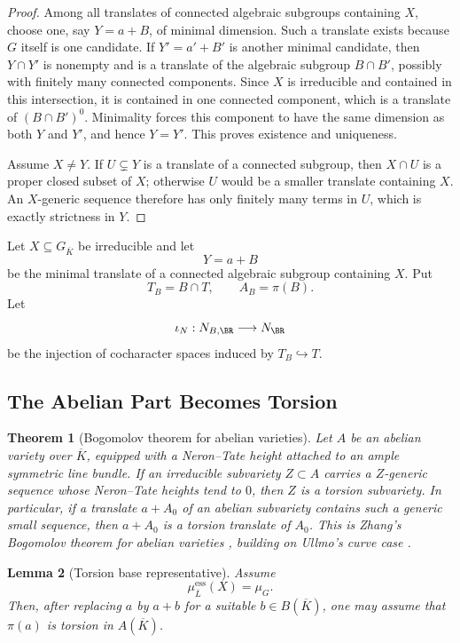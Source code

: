 \documentclass[10pt,a4paper]{amsart}
\theoremstyle{plain}
\newtheorem{theorem}{Theorem}
\newtheorem{lemma}[theorem]{Lemma}
\theoremstyle{plain}
\numberwithin{equation}{section}
\providecommand{\bL}{\overline{L}}
\providecommand{\muess}{\mu^{\mathrm{ess}}}
\begin{document}
\begin{proof}
	Among all translates of connected algebraic subgroups containing \(X\), choose
	one, say \(Y=a+B\), of minimal dimension.  Such a translate exists because
	\(G\) itself is one candidate.  If \(Y'=a'+B'\) is another minimal candidate,
	then \(Y\cap Y'\) is nonempty and is a translate of the algebraic subgroup
	\(B\cap B'\), possibly with finitely many connected components.  Since \(X\)
	is irreducible and contained in this intersection, it is contained in one
	connected component, which is a translate of \((B\cap B')^0\).  Minimality
	forces this component to have the same dimension as both \(Y\) and \(Y'\),
	and hence \(Y=Y'\).  This proves existence and uniqueness.
	
	Assume \(X\neq Y\).  If \(U\subsetneq Y\) is a translate of a connected
	subgroup, then \(X\cap U\) is a proper closed subset of \(X\); otherwise \(U\)
	would be a smaller translate containing \(X\).  An \(X\)-generic sequence
	therefore has only finitely many terms in \(U\), which is exactly strictness in
	\(Y\).
\end{proof}

Let \(X\subseteq G_{\overline{K}}\) be irreducible and let
\[
Y=a+B
\]
be the minimal translate of a connected algebraic subgroup containing \(X\).
Put
\[
T_B=B\cap T,\qquad A_B=\pi(B).
\]
Let
\[
\iota_N:N_{B,\BR}\longrightarrow N_{\BR}
\]
be the injection of cocharacter spaces induced by \(T_B\hookrightarrow T\).

\subsection{The Abelian Part Becomes Torsion}

\begin{theorem}[Bogomolov theorem for abelian varieties]
	\label{input:abelian-bogomolov}
	Let \(A\) be an abelian variety over \(\overline K\), equipped with a
	Neron--Tate height attached to an ample symmetric line bundle.  If an
	irreducible subvariety \(Z\subset A\) carries a \(Z\)-generic sequence whose
	Neron--Tate heights tend to \(0\), then \(Z\) is a torsion subvariety.  In
	particular, if a translate \(a+A_0\) of an abelian subvariety contains such a
	generic small sequence, then \(a+A_0\) is a torsion translate of \(A_0\).
	This is Zhang's Bogomolov theorem for abelian varieties
	\cite[Theorem~2]{Zha}, building on Ullmo's curve case \cite{Ull}.
\end{theorem}

\begin{lemma}[Torsion base representative]\label{lem:torsion-base}
	Assume
	\[
	\muess_{\bL}(X)=\mu_G.
	\]
	Then, after replacing \(a\) by \(a+b\) for a suitable \(b\in B(\overline{K})\), one may
	assume that \(\pi(a)\) is torsion in \(A(\overline{K})\).
\end{lemma}
\end{document}
